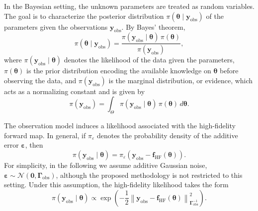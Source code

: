 \documentclass{elsarticle}
\begin{document}
In the Bayesian setting, the unknown parameters are treated as random variables. The goal is to characterize the posterior distribution $\pi(\boldsymbol{\theta}\mid \mathbf y_{\mathrm{obs}})$ of the parameters given the observations $\mathbf y_{\mathrm{obs}}$. By Bayes' theorem,
\begin{equation}
\label{eq:bayes}
    \pi(\boldsymbol{\theta}\mid \mathbf y_{\mathrm{obs}})
    =
    \frac{\pi(\mathbf y_{\mathrm{obs}}\mid \boldsymbol{\theta})\,\pi(\boldsymbol{\theta})}
    {\pi(\mathbf y_{\mathrm{obs}})},
\end{equation}
where $\pi(\mathbf y_{\mathrm{obs}}\mid \boldsymbol{\theta})$ denotes the likelihood of the data given the parameters, $\pi(\boldsymbol{\theta})$ is the prior distribution encoding the available knowledge on $\boldsymbol{\theta}$ before observing the data, and $\pi(\mathbf y_{\mathrm{obs}})$ is the marginal distribution, or evidence, which acts as a normalizing constant and is given by
\begin{equation}
\label{eq:marginal}
    \pi(\mathbf y_{\mathrm{obs}})
    =
    \int_{\Theta}
    \pi(\mathbf y_{\mathrm{obs}}\mid \boldsymbol{\theta})\,\pi(\boldsymbol{\theta})
    \, d\boldsymbol{\theta}.
\end{equation}

The observation model induces a likelihood associated with the high-fidelity forward map. In general, if $\pi_{\varepsilon}$ denotes the probability density of the additive error $\boldsymbol{\varepsilon}$, then
\begin{equation}
\label{eq:hf-like-general}
    \pi(\mathbf y_{\mathrm{obs}}\mid \boldsymbol{\theta})
    =
    \pi_{\varepsilon}\!\left(
    \mathbf y_{\mathrm{obs}} - \mathbf f_{\mathrm{HF}}(\boldsymbol{\theta})
    \right).
\end{equation}
For simplicity, in the following we assume additive Gaussian noise, $\boldsymbol{\varepsilon}\sim\mathcal N(\mathbf 0,\mathbf \Gamma_{\mathrm{obs}})$, although the proposed methodology is not restricted to this setting. Under this assumption, the high-fidelity likelihood takes the form
\begin{equation}
\label{eq:hf-like-gaussian}
    \pi(\mathbf y_{\mathrm{obs}}\mid \boldsymbol{\theta})
    \propto
    \exp\!\left(
    -\frac{1}{2}
    \left\|
    \mathbf y_{\mathrm{obs}}-\mathbf f_{\mathrm{HF}}(\boldsymbol{\theta})
    \right\|^2_{\mathbf \Gamma_{\mathrm{obs}}^{-1}}
    \right).
\end{equation}
\end{document}
